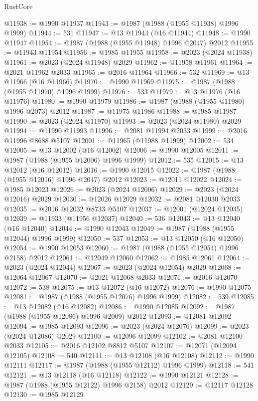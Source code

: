 \begin{lexlean}{RustCore}
\begin{coremodule}
@11938 := @1990 @11937
@11943 := @1987 (@1988 (@1955 @11938) @1996 @1999)
@11944 := 531
@11947 := @13 @11944 (@16 @11944)
@11948 := @1990 @11947
@11954 := @1987 (@1988 (@1955 @11948) @1996 @2047) @2012
@11955 := @11943 @11954
@11956 := @1985 @11955
@11958 := @2023 (@2024 @11938)
@11961 := @2023 (@2024 @11948) @2029
@11962 := @11958 @11961
@11964 := @2021 @11962 @2033
@11965 := @2016 @11964
@11966 := 532
@11969 := @13 @11966 (@16 @11966)
@11970 := @1990 @11969
@11975 := @1987 (@1988 (@1955 @11970) @1996 @1999)
@11976 := 533
@11979 := @13 @11976 (@16 @11976)
@11980 := @1990 @11979
@11986 := @1987 (@1988 (@1955 @11980) @1996 @2073) @2012
@11987 := @11975 @11986
@11988 := @1985 @11987
@11990 := @2023 (@2024 @11970)
@11993 := @2023 (@2024 @11980) @2029
@11994 := @11990 @11993
@11996 := @2081 @11994 @2033
@11999 := @2016 @11996 @8688 @5107
@12001 := @11965 (@11988 @11999)
@12002 := 534
@12005 := @13 @12002 (@16 @12002)
@12006 := @1990 @12005
@12011 := @1987 (@1988 (@1955 @12006) @1996 @1999)
@12012 := 535
@12015 := @13 @12012 (@16 @12012)
@12016 := @1990 @12015
@12022 := @1987 (@1988 (@1955 @12016) @1996 @2047) @2012
@12023 := @12011 @12022
@12024 := @1985 @12023
@12026 := @2023 (@2024 @12006)
@12029 := @2023 (@2024 @12016) @2029
@12030 := @12026 @12029
@12032 := @2081 @12030 @2033
@12035 := @2016 @12032 @8733 @5107
@12037 := @12001 (@12024 @12035)
@12039 := @11933 (@11956 @12037)
@12040 := 536
@12043 := @13 @12040 (@16 @12040)
@12044 := @1990 @12043
@12049 := @1987 (@1988 (@1955 @12044) @1996 @1999)
@12050 := 537
@12053 := @13 @12050 (@16 @12050)
@12054 := @1990 @12053
@12060 := @1987 (@1988 (@1955 @12054) @1996 @2158) @2012
@12061 := @12049 @12060
@12062 := @1985 @12061
@12064 := @2023 (@2024 @12044)
@12067 := @2023 (@2024 @12054) @2029
@12068 := @12064 @12067
@12070 := @2021 @12068 @2033
@12071 := @2016 @12070
@12072 := 538
@12075 := @13 @12072 (@16 @12072)
@12076 := @1990 @12075
@12081 := @1987 (@1988 (@1955 @12076) @1996 @1999)
@12082 := 539
@12085 := @13 @12082 (@16 @12082)
@12086 := @1990 @12085
@12092 := @1987 (@1988 (@1955 @12086) @1996 @2009) @2012
@12093 := @12081 @12092
@12094 := @1985 @12093
@12096 := @2023 (@2024 @12076)
@12099 := @2023 (@2024 @12086) @2029
@12100 := @12096 @12099
@12102 := @2081 @12100 @2033
@12105 := @2016 @12102 @8812 @5107
@12107 := @12071 (@12094 @12105)
@12108 := 540
@12111 := @13 @12108 (@16 @12108)
@12112 := @1990 @12111
@12117 := @1987 (@1988 (@1955 @12112) @1996 @1999)
@12118 := 541
@12121 := @13 @12118 (@16 @12118)
@12122 := @1990 @12121
@12128 := @1987 (@1988 (@1955 @12122) @1996 @2158) @2012
@12129 := @12117 @12128
@12130 := @1985 @12129

\end{coremodule}
\end{lexlean}
